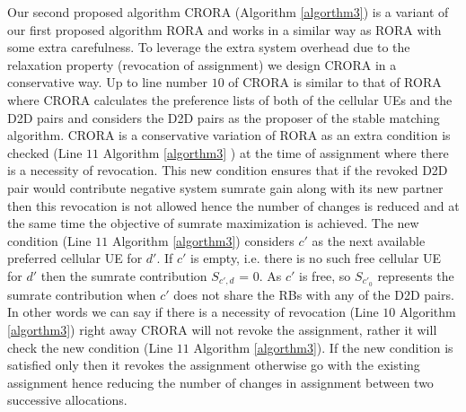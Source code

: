 \documentclass[times]{dacauth}
\begin{document}
\noindent
Our second proposed algorithm CRORA (Algorithm \ref{algorthm3}) is a variant of our first proposed algorithm RORA and works in a similar way as RORA with some extra carefulness. To leverage the extra system overhead due to the relaxation property (revocation of assignment) we design CRORA in a conservative way. Up to line number $10$ of CRORA is similar to that of  RORA where CRORA calculates the preference lists of both of the cellular UEs and the D2D pairs and considers the D2D pairs as the proposer of the stable matching algorithm. CRORA is a conservative variation of RORA as an extra condition is checked (Line $11$   Algorithm \ref{algorthm3} ) at the time of assignment where there is a necessity of revocation. This new condition ensures that if the revoked D2D pair would contribute negative system sumrate gain along with its new partner then this revocation is not allowed hence the number of changes is reduced and at the same time the objective of sumrate maximization is achieved. The new condition (Line $11$  Algorithm \ref{algorthm3}) considers $c'$ as the next available preferred cellular UE for $d'$. If $c'$ is empty, i.e. there is no such free cellular UE for $d'$ then the sumrate contribution $S_{c',d}$ = 0. As $c'$ is free, so  $S_{c'_0}$ represents the sumrate contribution when $c'$ does not share the RBs with any of the D2D pairs. In other words we can say if there is a necessity of revocation (Line $10$ Algorithm \ref{algorthm3}) right away CRORA will not revoke the assignment, rather it will check the new condition (Line $11$ Algorithm \ref{algorthm3}). If the new condition is satisfied only then it revokes the assignment otherwise go with the existing assignment hence reducing the number of changes in assignment between two successive allocations. 
 
\end{document}

